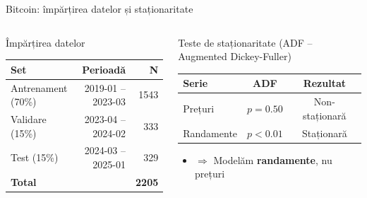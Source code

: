 \documentclass[9pt, aspectratio=169, t]{beamer}
\begin{document}
\begin{frame}{Bitcoin: împărțirea datelor și staționaritate}
    \vspace{-0.1cm}
    \begin{columns}[T]
        \begin{block}{Împărțirea datelor}
            \begin{center}
            \begin{tabular}{lrr}
                \toprule
                \textbf{Set} & \textbf{Perioadă} & \textbf{N} \\
                \midrule
                Antrenament (70\%) & 2019-01 -- 2023-03 & 1543 \\
                Validare (15\%) & 2023-04 -- 2024-02 & 333 \\
                Test (15\%) & 2024-03 -- 2025-01 & 329 \\
                \midrule
                \textbf{Total} & & \textbf{2205} \\
                \bottomrule
            \end{tabular}
            \end{center}
        \end{block}

        \begin{block}{Teste de staționaritate (ADF -- Augmented Dickey-Fuller)}
            \begin{center}
            \begin{tabular}{lcc}
                \toprule
                \textbf{Serie} & \textbf{ADF} & \textbf{Rezultat} \\
                \midrule
                Prețuri & $p = 0.50$ & Non-staționară \\
                Randamente & $p < 0.01$ & \textcolor{Forest}{Staționară} \\
                \bottomrule
            \end{tabular}
            \end{center}

            \begin{itemize}\setlength{\itemsep}{0pt}
                \item $\Rightarrow$ Modelăm \textbf{randamente}, nu prețuri
            \end{itemize}
        \end{block}
    \end{columns}


\end{frame}
\end{document}

